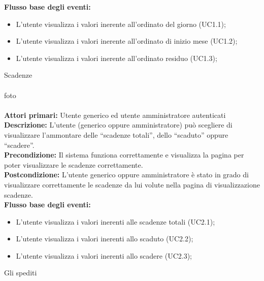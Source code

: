 \textbf{Flusso base degli eventi:} 

\begin{itemize}

\item L’utente visualizza i valori inerente all’ordinato del giorno (UC1.1);
\item L’utente visualizza i valori inerente all’ordinato di inizio mese (UC1.2);
\item L’utente visualizza i valori inerente all’ordinato residuo (UC1.3);

\end{itemize}



Scadenze \\\\

foto\\\\

\textbf{Attori primari:} Utente generico ed utente amministratore autenticati
\\


\textbf{Descrizione:}  L’utente (generico oppure amministratore) può scegliere di visualizzare l’ammontare delle “scadenze totali”, dello “scaduto” oppure “scadere”.  \\

\textbf{Precondizione:} Il sistema funziona correttamente e visualizza la pagina per poter visualizzare le scadenze correttamente. \\

\textbf{Postcondizione:} L’utente generico oppure amministratore è stato in grado di visualizzare correttamente le scadenze da lui volute nella pagina di visualizzazione scadenze. \\


\textbf{Flusso base degli eventi:} 

\begin{itemize}

\item L’utente visualizza i valori inerenti alle scadenze totali (UC2.1);
\item L’utente visualizza i valori inerenti allo scaduto (UC2.2);
\item L’utente visualizza i valori inerenti allo scadere (UC2.3);


\end{itemize}




Gli spediti \\\\


